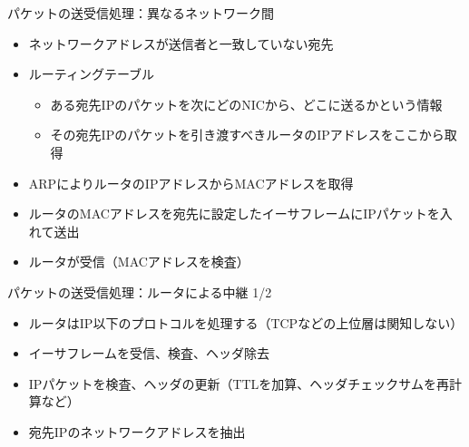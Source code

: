 \documentclass[12pt,aspectratio=169]{beamer}
\begin{document}
\begin{frame}{パケットの送受信処理：異なるネットワーク間}

  \begin{itemize}
    \item ネットワークアドレスが送信者と一致していない宛先
    \vspace{0.5cm}
    \item ルーティングテーブル
      \begin{itemize}
        \item ある宛先IPのパケットを次にどのNICから、どこに送るかという情報
        \item その宛先IPのパケットを引き渡すべきルータのIPアドレスをここから取得 %
      \end{itemize}
    \item ARPによりルータのIPアドレスからMACアドレスを取得
    \item ルータのMACアドレスを宛先に設定したイーサフレームにIPパケットを入れて送出
    \item ルータが受信（MACアドレスを検査）

  \end{itemize}

\end{frame}

\begin{frame}{パケットの送受信処理：ルータによる中継 1/2}

  \begin{itemize}
    \item ルータはIP以下のプロトコルを処理する（TCPなどの上位層は関知しない）
    \vspace{0.5cm}
    \item イーサフレームを受信、検査、ヘッダ除去
    \item IPパケットを検査、ヘッダの更新（TTLを加算、ヘッダチェックサムを再計算など） %
    \item 宛先IPのネットワークアドレスを抽出
  \end{itemize}

\end{frame}
\end{document}
